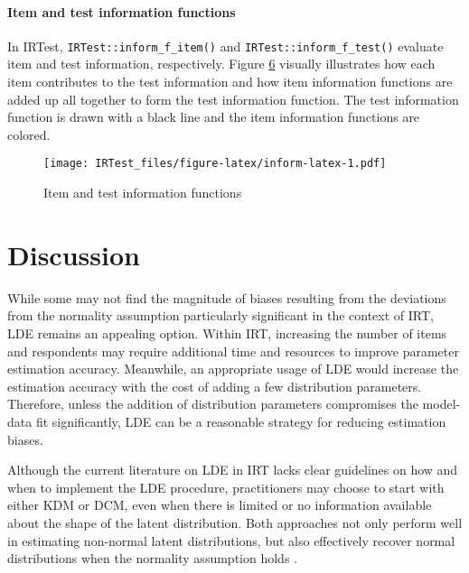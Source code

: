 \hypertarget{item-and-test-information-functions}{%
\paragraph{Item and test information functions}\label{item-and-test-information-functions}}

In IRTest, \texttt{IRTest::inform\_f\_item()} and \texttt{IRTest::inform\_f\_test()}
evaluate item and test information, respectively. Figure
\protect\hyperlink{fig:inform-latex}{6} visually illustrates how each item
contributes to the test information and how item information functions
are added up all together to form the test information function. The
test information function is drawn with a black line and the item
information functions are colored.

\begin{figure}
\hypertarget{fig:inform-latex}{%
\centering
\texttt{[image: IRTest\_files/figure-latex/inform-latex-1.pdf]}
\caption{Item and test information
functions}\label{fig:inform-latex}
}
\end{figure}

\hypertarget{discussion}{%
\section{Discussion}\label{discussion}}

While some may not find the magnitude of biases resulting from the
deviations from the normality assumption particularly significant in the
context of IRT, LDE remains an appealing option. Within IRT, increasing
the number of items and respondents may require additional time and
resources to improve parameter estimation accuracy. Meanwhile, an
appropriate usage of LDE would increase the estimation accuracy with the
cost of adding a few distribution parameters. Therefore, unless the
addition of distribution parameters compromises the model-data fit
significantly, LDE can be a reasonable strategy for reducing estimation
biases.

Although the current literature on LDE in IRT lacks clear guidelines on
how and when to implement the LDE procedure, practitioners may choose to
start with either KDM or DCM, even when there is limited or no
information available about the shape of the latent distribution. Both
approaches not only perform well in estimating non-normal latent
distributions, but also effectively recover normal distributions when
the normality assumption holds \citep{Li:2022, Woods+Lin:2009}.

